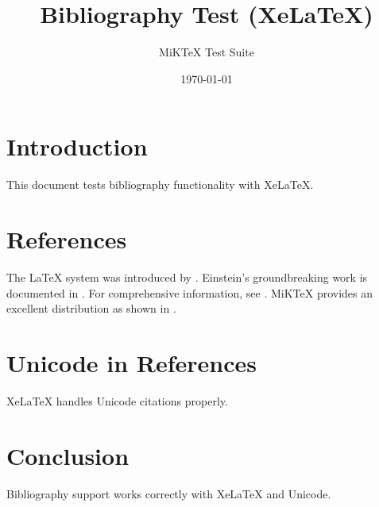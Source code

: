 \documentclass{article}
\title{Bibliography Test (XeLaTeX)}
\author{MiKTeX Test Suite}
\date{\today}
\begin{document}
\maketitle

\section{Introduction}
This document tests bibliography functionality with XeLaTeX.

\section{References}
The \LaTeX{} system was introduced by \cite{lamport1994}. 
Einstein's groundbreaking work is documented in \cite{einstein1905}.
For comprehensive information, see \cite{goossens1994}.
MiKTeX provides an excellent distribution as shown in \cite{miktex2023}.

\section{Unicode in References}
XeLaTeX handles Unicode citations properly.

\section{Conclusion}
Bibliography support works correctly with XeLaTeX and Unicode.



\end{document}
